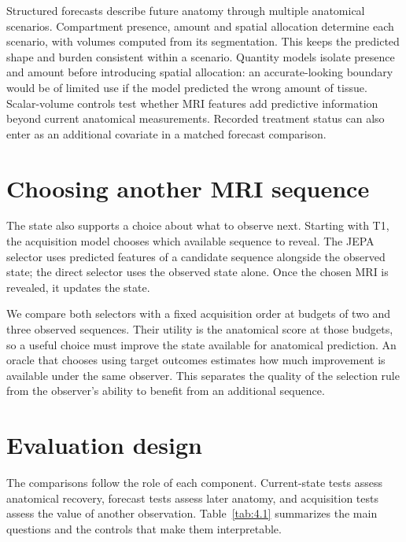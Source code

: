 Structured forecasts describe future anatomy through multiple anatomical scenarios. Compartment presence, amount and spatial allocation determine each scenario, with volumes computed from its segmentation. This keeps the predicted shape and burden consistent within a scenario. Quantity models isolate presence and amount before introducing spatial allocation: an accurate-looking boundary would be of limited use if the model predicted the wrong amount of tissue. Scalar-volume controls test whether MRI features add predictive information beyond current anatomical measurements. Recorded treatment status can also enter as an additional covariate in a matched forecast comparison.

\section{Choosing another MRI sequence}

The state also supports a choice about what to observe next. Starting with T1, the acquisition model chooses which available sequence to reveal. The JEPA selector uses predicted features of a candidate sequence alongside the observed state; the direct selector uses the observed state alone. Once the chosen MRI is revealed, it updates the state.

We compare both selectors with a fixed acquisition order at budgets of two and three observed sequences. Their utility is the anatomical score at those budgets, so a useful choice must improve the state available for anatomical prediction. An oracle that chooses using target outcomes estimates how much improvement is available under the same observer. This separates the quality of the selection rule from the observer's ability to benefit from an additional sequence.

\section{Evaluation design}\label{sec:evaluation}

The comparisons follow the role of each component. Current-state tests assess anatomical recovery, forecast tests assess later anatomy, and acquisition tests assess the value of another observation. Table~\ref{tab:4.1} summarizes the main questions and the controls that make them interpretable.

